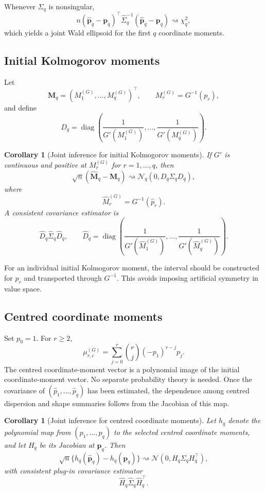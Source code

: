 \documentclass[11pt,a4paper]{article}
\newtheorem{corollary}[theorem]{Corollary}
\theoremstyle{definition}
\newcommand{\diag}{\operatorname{diag}}
\begin{document}
Whenever $\Sigma_q$ is nonsingular,
\[
n(\widehat{\mathbf p}_q-\mathbf p_q)^\top
\widehat\Sigma_q^{-1}
(\widehat{\mathbf p}_q-\mathbf p_q)
\rightsquigarrow
\chi_q^2,
\]
which yields a joint Wald ellipsoid for the first $q$ coordinate moments.

\subsection{Initial Kolmogorov moments}

Let
\[
\mathbf M_q
=
(M_1^{(G)},\ldots,M_q^{(G)})^\top,
\qquad
M_r^{(G)}=G^{-1}(p_r),
\]
and define
\[
D_q
=
\diag\left(
\frac1{G'(M_1^{(G)})},\ldots,
\frac1{G'(M_q^{(G)})}
\right).
\]

\begin{corollary}[Joint inference for initial Kolmogorov moments]\label{cor:pulled-moments}
If $G'$ is continuous and positive at $M_r^{(G)}$ for $r=1,\ldots,q$, then
\[
\sqrt n(\widehat{\mathbf M}_q-\mathbf M_q)
\rightsquigarrow
\mathcal N_q(0,D_q\Sigma_qD_q),
\]
where
\[
\widehat M_r^{(G)}=G^{-1}(\widehat p_r).
\]
A consistent covariance estimator is
\[
\widehat D_q\widehat\Sigma_q\widehat D_q,
\qquad
\widehat D_q
=
\diag\left(
\frac1{G'(\widehat M_1^{(G)})},\ldots,
\frac1{G'(\widehat M_q^{(G)})}
\right).
\]
\end{corollary}

For an individual initial Kolmogorov moment, the interval should be constructed for $p_r$ and transported through $G^{-1}$. This avoids imposing artificial symmetry in value space.

\subsection{Centred coordinate moments}

Set $p_0=1$. For $r\geq2$,
\[
\mu_{r,c}^{(G)}
=
\sum_{j=0}^r
\binom rj(-p_1)^{r-j}p_j.
\]
The centred coordinate-moment vector is a polynomial image of the initial coordinate-moment vector. No separate probability theory is needed. Once the covariance of $(\widehat p_1,\ldots,\widehat p_q)$ has been estimated, the dependence among centred dispersion and shape summaries follows from the Jacobian of this map.

\begin{corollary}[Joint inference for centred coordinate moments]\label{cor:centered-moments}
Let $h_q$ denote the polynomial map from $(p_1,\ldots,p_q)$ to the selected centred coordinate moments, and let $H_q$ be its Jacobian at $\mathbf p_q$. Then
\[
\sqrt n\{h_q(\widehat{\mathbf p}_q)-h_q(\mathbf p_q)\}
\rightsquigarrow
\mathcal N(0,H_q\Sigma_qH_q^\top),
\]
with consistent plug-in covariance estimator
\[
\widehat H_q\widehat\Sigma_q\widehat H_q^\top.
\]
\end{corollary}
\end{document}

